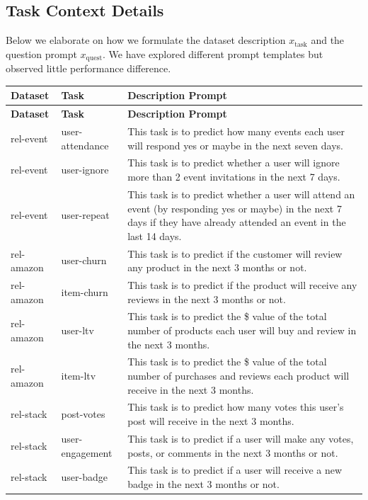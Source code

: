 \documentclass[11pt]{article}
\begin{document}
\subsection{Task Context Details}
Below we elaborate on how we formulate the dataset description $x_{\text{task}}$ and the question prompt $x_{\text{quest}}$. We have explored different prompt templates but observed little performance difference. 
\small
\begin{longtable}{@{}p{2cm}p{2cm}p{11cm}@{}}
    \toprule
    \textbf{Dataset} & \textbf{Task} & \textbf{Description Prompt} \\
    \midrule
    \endfirsthead
    \toprule
    \textbf{Dataset} & \textbf{Task} & \textbf{Description Prompt} \\
    \midrule
    \endhead
    \bottomrule
    \endfoot
    rel-event & user-attendance & This task is to predict how many events each user will respond yes or maybe in the next seven days. \\
    rel-event & user-ignore & This task is to predict whether a user will ignore more than 2 event invitations in the next 7 days. \\
    rel-event & user-repeat & This task is to predict whether a user will attend an event (by responding yes or maybe) in the next 7 days if they have already attended an event in the last 14 days. \\
    rel-amazon & user-churn & This task is to predict if the customer will review any product in the next 3 months or not. \\
    rel-amazon & item-churn & This task is to predict if the product will receive any reviews in the next 3 months or not. \\
    rel-amazon & user-ltv & This task is to predict the \$ value of the total number of products each user will buy and review in the next 3 months. \\
    rel-amazon & item-ltv & This task is to predict the \$ value of the total number of purchases and reviews each product will receive in the next 3 months. \\
    rel-stack & post-votes & This task is to predict how many votes this user's post will receive in the next 3 months. \\
    rel-stack & user-engagement & This task is to predict if a user will make any votes, posts, or comments in the next 3 months or not. \\
    rel-stack & user-badge & This task is to predict if a user will receive a new badge in the next 3 months or not. \\

\end{longtable}
\end{document}
